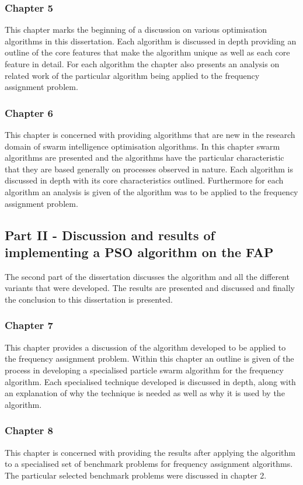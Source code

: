 \subsubsection{Chapter 5}
This chapter marks the beginning of a discussion on various optimisation algorithms in this dissertation. Each algorithm is discussed in depth providing an outline of the core features that make the algorithm unique as well as each core feature in detail. For each algorithm the chapter also presents an analysis on related work of the particular algorithm being applied to the frequency assignment problem. 
\subsubsection{Chapter 6}
This chapter is concerned with providing algorithms that are new in the research domain of swarm intelligence optimisation algorithms. In this chapter swarm algorithms are presented and the algorithms have the particular characteristic that they are based generally on processes observed in nature. Each algorithm is discussed in depth with its core characteristics outlined. Furthermore for each algorithm an analysis is given of the algorithm was to be applied to the frequency assignment problem.
\subsection{Part II - Discussion and results of implementing a PSO algorithm on the FAP}
The second part of the dissertation discusses the algorithm and all the different variants that were developed. The results are presented and discussed and finally the conclusion to this dissertation is presented.
\subsubsection{Chapter 7}
This chapter provides a discussion of the algorithm developed to be applied to the frequency assignment problem. Within this chapter an outline is given of the process in developing a specialised particle swarm algorithm for the frequency algorithm. Each specialised technique developed is discussed in depth, along with an explanation of why the technique is needed as well as why it is used by the algorithm.
\subsubsection{Chapter 8}
This chapter is concerned with providing the results after applying the algorithm to a specialised set of benchmark problems for frequency assignment algorithms. The particular selected benchmark problems were discussed in chapter 2.
